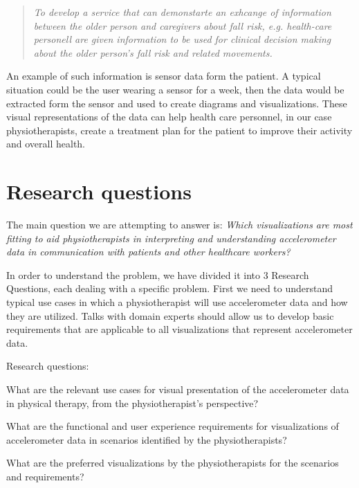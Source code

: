 \begin{quote}
\textit{To develop a service that can demonstarte an exhcange of information between the older person and caregivers about fall risk, e.g. health-care personell are given information to be used for clinical decision making about the older person's fall risk and related movements.}
\end{quote}

An example of such information is sensor data form the patient. A typical situation could be the user wearing a sensor for a week, then the data would be extracted form the sensor and used to create diagrams and visualizations. These visual representations of the data can help health care personnel, in our case physiotherapists, create a treatment plan for the patient to improve their activity and overall health. 

\section{Research questions}
The main question we are attempting to answer is: \textit{Which visualizations are most fitting to aid physiotherapists in interpreting and understanding accelerometer data in communication with patients and other healthcare workers?}

In order to understand the problem, we have divided it into 3 Research Questions, each dealing with a specific problem. First we need to understand typical use cases in which a physiotherapist will use accelerometer data and how they are utilized. Talks with domain experts should allow us to develop basic requirements that are applicable to all visualizations that represent accelerometer data.

Research questions:
\vspace{-15pt}
\begin{description}[parsep=0pt, itemsep=0pt]
\item[Research Question 1:] What are the relevant use cases for visual presentation of the accelerometer data in physical therapy, from the physiotherapist's perspective?

\item[Research Question 2:] What are the functional and user experience requirements for visualizations of accelerometer data in scenarios identified by the physiotherapists?

\item[Research Question 3:] What are the preferred visualizations by the physiotherapists for the scenarios and requirements?
\end{description}


